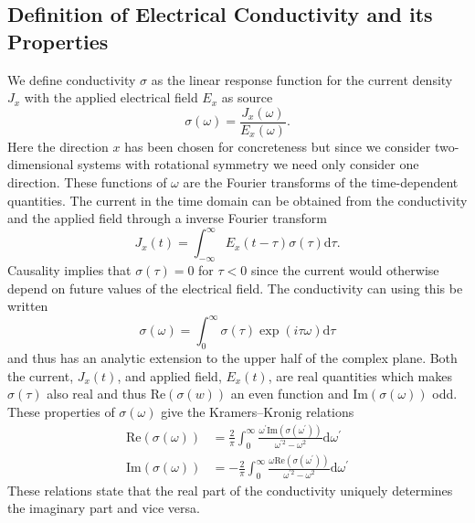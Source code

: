 \documentclass[12pt]{report}
\renewcommand{\d}{\ensuremath{\mathrm{d}}}
\renewcommand{\i}{\ensuremath{i}}
\newcommand{\re}{\ensuremath{\mathrm{Re}}}
\newcommand{\im}{\ensuremath{\mathrm{Im}}}
\begin{document}
\subsection{Definition of Electrical Conductivity and its Properties}
We define conductivity $\sigma$ as the linear response function for the current density $J_x$ with the applied electrical field $E_x$ as source
\begin{equation}
 \sigma(\omega)=\frac{J_x(\omega)}{E_x(\omega)}\label{sigma}.
\end{equation}
Here the direction $x$ has been chosen for concreteness but since we consider two-dimensional systems with rotational symmetry we need only consider one direction. These functions of $\omega$ are the Fourier transforms of the time-dependent quantities. The current in the time domain can be obtained from the conductivity and the applied field through a inverse Fourier transform
\begin{equation}
 J_x(t)=\int_{-\infty}^\infty E_x(t-\tau)\sigma(\tau)\d \tau.
\end{equation}
Causality implies that $\sigma(\tau)=0$ for $\tau<0$ since the current would otherwise depend on future values of the electrical field. The conductivity can using this be written
\begin{equation}
 \sigma(\omega)=\int_0^\infty\sigma(\tau)\exp(\i\tau\omega)\d\tau
\end{equation}
and thus has an analytic extension to the upper half of the complex plane. Both the current, $J_x(t)$, and applied field, $E_x(t)$, are real quantities which makes $\sigma(\tau)$ also real and thus $\re(\sigma(w))$ an even function and $\im(\sigma(\omega))$ odd. These properties of $\sigma(\omega)$ give the Kramers–Kronig relations
\begin{equation}
\begin{split}
 \re(\sigma(\omega))&=\frac{2}{\pi}\int_0^\infty\frac{\omega^\prime\im(\sigma(\omega^\prime))}{\omega^{\prime 2}-\omega^2}\d \omega^\prime\\
\im(\sigma(\omega))&=-\frac{2}{\pi}\int_0^\infty\frac{\omega\re(\sigma(\omega^\prime))}{\omega^{\prime 2}-\omega^2}\d \omega^\prime\label{kk}
\end{split}
\end{equation}
These relations state that the real part of the conductivity uniquely determines the imaginary part and vice versa.
\end{document}
